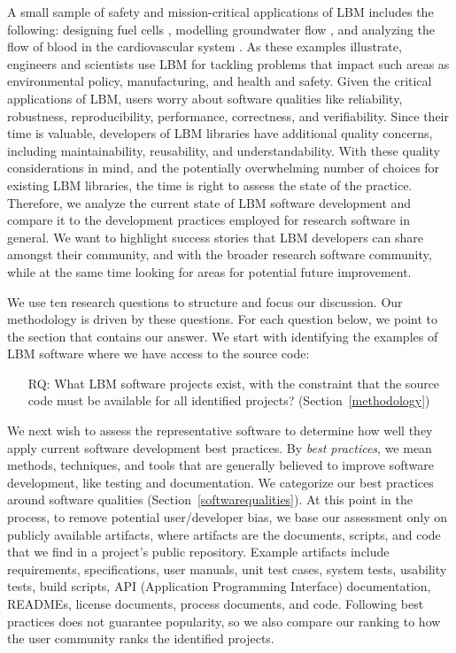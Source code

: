 \documentclass[final, 3p, times, authoryear]{elsarticle}
\newcounter{rqnum} %
\begin{document}
A small sample of safety and mission-critical applications of LBM includes the
following: designing fuel cells \citep{ZhangEtAl2018}, modelling groundwater
flow \citep{AnwarAndSukop2009}, and analyzing the flow of blood in the
cardiovascular system \citep{SadeghiEtAl2022b, SadeghiEtAl2022,
SadeghiEtAl2020}.  As these examples illustrate, engineers and scientists use
LBM for tackling problems that impact such areas as environmental policy,
manufacturing, and health and safety. Given the critical applications of LBM,
users worry about software qualities like reliability, robustness,
reproducibility, performance, correctness, and verifiability.  Since their time
is valuable, developers of LBM libraries have additional quality concerns,
including maintainability, reusability, and understandability.  With these
quality considerations in mind, and the potentially overwhelming number of
choices for existing LBM libraries, the time is right to assess the state of the
practice. Therefore, we analyze the current state of LBM software development
and compare it to the development practices employed for research software in
general.  We want to highlight success stories that LBM developers can share
amongst their community, and with the broader research software community, while
at the same time looking for areas for potential future improvement.

We use ten research questions to structure and focus our discussion. Our
methodology \citep{SmithEtAl2021, SmithAndMichalski2022} is driven by these
questions. For each question below, we point to the section that contains our
answer.  We start with identifying the examples of LBM software where we have
access to the source code:

\begin{enumerate}
	\item[RQ\refstepcounter{rqnum}\therqnum \label{RQ_WhatProjects}:] What LBM
	software projects exist, with the constraint that the source code must be
	available for all identified projects? (Section~\ref{methodology})
\end{enumerate}

We next wish to assess the representative software to determine how well they
apply current software development best practices.  By \emph{best practices}, we
mean methods, techniques, and tools that are generally believed to improve
software development, like testing and documentation.  We categorize our best
practices around software qualities (Section~\ref{softwarequalities}).  At this
point in the process, to remove potential user/developer bias, we base our
assessment only on publicly available artifacts, where artifacts are the
documents, scripts, and code that we find in a project's public repository.
Example artifacts include requirements, specifications, user manuals, unit test
cases, system tests, usability tests, build scripts, API (Application
Programming Interface) documentation, READMEs, license documents, process
documents, and code. Following best practices does not guarantee popularity, so
we also compare our ranking to how the user community ranks the identified
projects.
\end{document}
